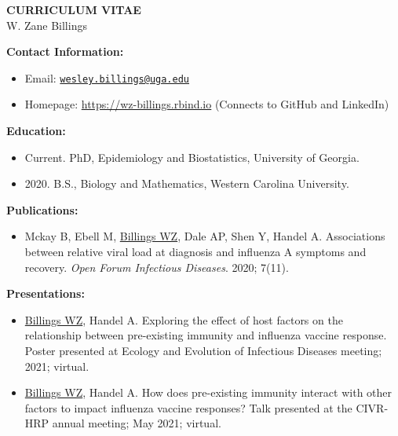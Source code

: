 \documentclass[11pt]{article}
\begin{document}
\begin{center}
\large{
	{\bf CURRICULUM VITAE} \\
	W. Zane Billings \\}
	\hrulefill
\end{center}

\normalsize

{\bf Contact Information:}
\begin{itemize}[noitemsep]
\item Email: \href{mailto:wesley.billings@uga.edu}{\texttt{wesley.billings@uga.edu}}
\item Homepage: \url{https://wz-billings.rbind.io} (Connects to GitHub and LinkedIn)
\end{itemize}

\vspace{0.2in}
\textbf{Education:}

\begin{itemize}
\item Current. PhD, Epidemiology and Biostatistics, University of Georgia.
\item 2020. B.S., Biology and Mathematics, Western Carolina University.
\end{itemize}

\vspace{0.2in}
\textbf{Publications:}

\begin{itemize}[noitemsep]
\item Mckay B, Ebell M, \ul{Billings WZ}, Dale AP, Shen Y, Handel A. Associations between relative viral load at diagnosis and influenza A symptoms and recovery. \textit{Open Forum Infectious Diseases}. 2020; 7(11).
\end{itemize}

\vspace{0.2in}
\textbf{Presentations:}

\begin{itemize}[noitemsep]
\item \ul{Billings WZ}, Handel A. Exploring the effect of host factors on the relationship between pre-existing immunity and influenza vaccine response. Poster presented at Ecology and Evolution of Infectious Diseases meeting; 2021; virtual.
\item \ul{Billings WZ}, Handel A. How does pre-existing immunity interact with other factors to impact influenza vaccine responses? Talk presented at the CIVR-HRP annual meeting; May 2021; virtual.
\end{itemize}
\end{document}
